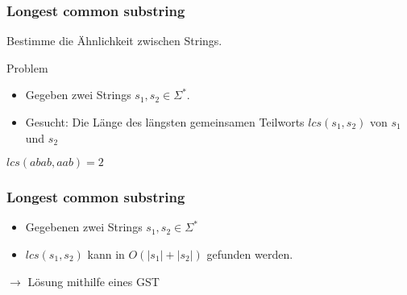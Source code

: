 \documentclass{beamer}
\newcommand{\abs}[1]{\left|#1\right|}
\begin{document}
\begin{frame}
\frametitle{Longest common substring}
Bestimme die Ähnlichkeit zwischen Strings.

\begin{block}{Problem}
\begin{itemize}
    \item Gegeben zwei Strings $s_1, s_2 \in \Sigma^*$.
    \item Gesucht: Die Länge des längsten gemeinsamen Teilworts $lcs(s_1, s_2)$ von $s_1$ und $s_2$
\end{itemize}
\end{block}
\begin{example}
$lcs(abab, aab) = 2$
\end{example}
\end{frame}

\begin{frame}
\frametitle{Longest common substring}
\begin{theorem}
\begin{itemize}
    \item Gegebenen zwei Strings $s_1, s_2 \in \Sigma^*$
    \item $lcs(s_1, s_2)$ kann in $O(\abs{s_1} + \abs{s_2})$ gefunden werden.
\end{itemize}
\end{theorem}
\vspace{5mm}
$\rightarrow$ Lösung mithilfe eines GST
\end{frame}
\end{document}
